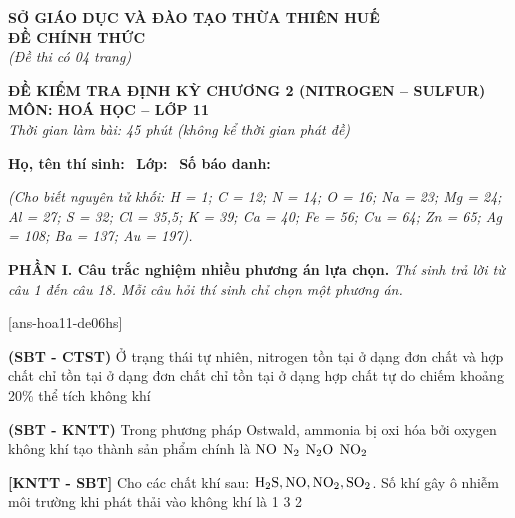 \documentclass[12pt,a4paper]{article}
\begin{document}
\thispagestyle{firstpage}

\noindent
\begin{minipage}[t]{0.44\textwidth}
	\centering\fontsize{10pt}{12pt}\selectfont
	\textbf{SỞ GIÁO DỤC VÀ ĐÀO TẠO THỪA THIÊN HUẾ}\\
	\textbf{ĐỀ CHÍNH THỨC}\\
	\textit{(Đề thi có 04 trang)}
\end{minipage}\hfill
\begin{minipage}[t]{0.54\textwidth}
	\centering\small
	\textbf{ĐỀ KIỂM TRA ĐỊNH KỲ CHƯƠNG 2 (NITROGEN -- SULFUR)}\\
	\textbf{MÔN: HOÁ HỌC -- LỚP 11}\\
	\textit{Thời gian làm bài: 45 phút (không kể thời gian phát đề)}\\
\end{minipage}

\smallskip
\noindent\hrulefill
\smallskip

\noindent\textbf{Họ, tên thí sinh:} \dotfill\ \textbf{Lớp:} \dotfill\ \textbf{Số báo danh:} \dotfill

\smallskip
\noindent\textit{(Cho biết nguyên tử khối: H = 1; C = 12; N = 14; O = 16; Na = 23; Mg = 24; Al = 27; S = 32; Cl = 35,5; K = 39; Ca = 40; Fe = 56; Cu = 64; Zn = 65; Ag = 108; Ba = 137; Au = 197).}
\smallskip

\noindent\textbf{\large PHẦN I. Câu trắc nghiệm nhiều phương án lựa chọn.}
\textit{Thí sinh trả lời từ câu 1 đến câu 18. Mỗi câu hỏi thí sinh chỉ chọn một phương án.}
\vspace{0.2cm}

[ans-hoa11-de06hs]

\begin{ex}
\textbf{(SBT - CTST)} Ở trạng thái tự nhiên, nitrogen
\choice
{\True tồn tại ở dạng đơn chất và hợp chất}
{chỉ tồn tại ở dạng đơn chất}
{chỉ tồn tại ở dạng hợp chất}
{tự do chiếm khoảng 20\% thể tích không khí}

\end{ex}

\begin{ex}
\textbf{(SBT - KNTT)} Trong phương pháp Ostwald, ammonia bị oxi hóa bởi oxygen không khí tạo thành sản phẩm chính là
\choice
{\True $\ce{NO}$}
{$\ce{N2}$}
{$\ce{N2O}$}
{$\ce{NO2}$}

\end{ex}

\begin{ex}
\textbf{[KNTT - SBT]} Cho các chất khí sau: $\ce{H2S, NO, NO2, SO2}$. Số khí gây ô nhiễm môi trường khi phát thải vào không khí là
\choice
{1}
{}
{3}
{2}

\end{ex}
\end{document}
